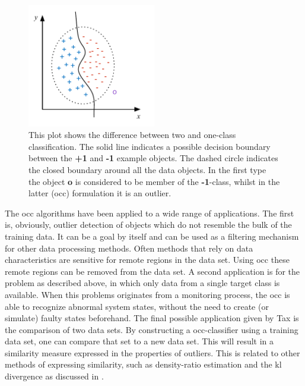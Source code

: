 \begin{figure}
  \centering
    \includegraphics[width=0.5\textwidth,keepaspectratio]{./Figures/chapter3/two-vs-one-classification.pdf}
  \caption[Difference between two and one-class classification]{This plot shows the difference between two and one-class classification. The solid line indicates a possible decision boundary between the \textbf{+1} and \textbf{-1} example objects. The dashed circle indicates the closed boundary around all the data objects. In the first type the object \textbf{o} is considered to be member of the \textbf{-1}-class, whilst in the latter (\gls{occ}) formulation it is an outlier.}
  \label{fig:two-vs-one-classification}
\end{figure}

The \gls{occ} algorithms have been applied to a wide range of applications.
The first is, obviously, outlier detection of objects which do not resemble the bulk of the training data.
It can be a goal by itself and can be used as a filtering mechanism for other data processing methods.
Often methods that rely on data characteristics are sensitive for remote regions in the data set.
Using \gls{occ} these remote regions can be removed from the data set.
A second application is for the problem as described above, in which only data from a single target class is available.
When this problems originates from \eg a monitoring process, the \gls{occ} is able to recognize abnormal system states, without the need to create (or simulate) faulty states beforehand.
The final possible application given by Tax \cite{tax2001one} is the comparison of two data sets.
By constructing a \gls{occ}-classifier using a training data set, one can compare that set to a new data set.
This will result in a similarity measure expressed in the properties of outliers.
This is related to other methods of expressing similarity, such as density-ratio estimation and the \gls{kl} divergence as discussed in .

